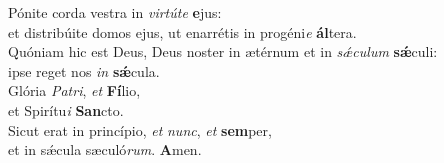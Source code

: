 \evenverse Pónite corda vestra in \textit{vir}\textit{tú}\textit{te} \textbf{e}jus:~\*\\
\evenverse et distribúite domos ejus, ut enarrétis in progéni\textit{e} \textbf{ál}tera.\\
\oddverse Quóniam hic est Deus, Deus noster in ætérnum et in \textit{sǽ}\textit{cu}\textit{lum} \textbf{sǽ}culi:~\*\\
\oddverse ipse reget nos \textit{in} \textbf{sǽ}cula.\\
\evenverse Glória \textit{Pa}\textit{tri}, \textit{et} \textbf{Fí}lio,~\*\\
\evenverse et Spirítu\textit{i} \textbf{San}cto.\\
\oddverse Sicut erat in princípio, \textit{et} \textit{nunc}, \textit{et} \textbf{sem}per,~\*\\
\oddverse et in sǽcula sæculó\textit{rum}. \textbf{A}men.\\

